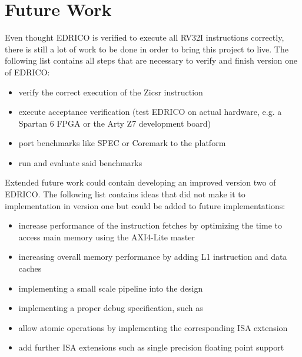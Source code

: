 \chapter{Future Work}
Even thought \ac{EDRICO} is verified to execute all \ac{RV32I} instructions correctly, there is still a lot of work to be done in order to bring this project to live. The following list contains all steps that are necessary to verify and finish version one of \ac{EDRICO}:\\

\begin{itemize}
\item verify the correct execution of the Zicsr instruction
\item execute acceptance verification (test \ac{EDRICO} on actual hardware, e.g. a Spartan 6 \ac{FPGA} or the Arty Z7 development board)
\item port benchmarks like SPEC or Coremark to the platform
\item run and evaluate said benchmarks
\end{itemize}

Extended future work could contain developing an improved version two of \ac{EDRICO}. The following list contains ideas that did not make it to implementation in version one but could be added to future implementations:\\


\begin{itemize}
	\item increase performance of the instruction fetches by optimizing the time to access main memory using the \ac{AXI4-Lite} master
	\item increasing overall memory performance by adding L1 instruction and data caches
	\item implementing a small scale pipeline into the design
	\item implementing a proper debug specification, such as \cite{riscv:debug}
	\item allow atomic operations by implementing the corresponding \ac{ISA} extension
	\item add further ISA extensions such as single precision floating point support
\end{itemize}